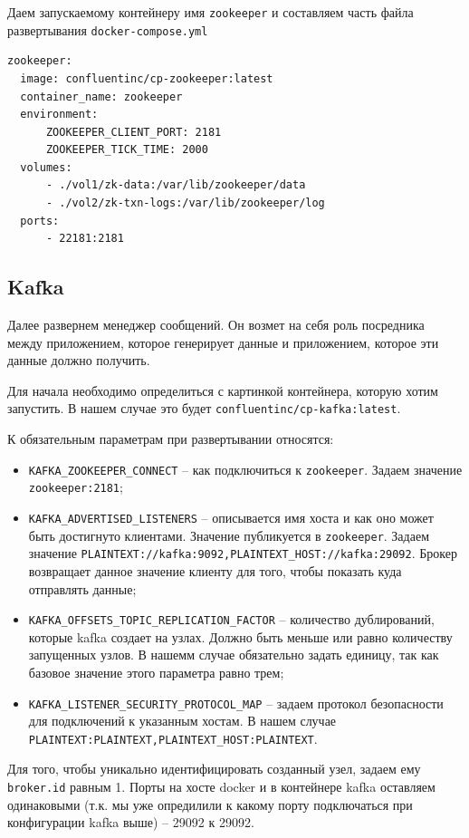 Даем запускаемому контейнеру имя \verb|zookeeper| и составляем часть файла
развертывания \verb|docker-compose.yml|
\begin{verbatim}
zookeeper:
  image: confluentinc/cp-zookeeper:latest
  container_name: zookeeper
  environment:
      ZOOKEEPER_CLIENT_PORT: 2181
      ZOOKEEPER_TICK_TIME: 2000
  volumes:
      - ./vol1/zk-data:/var/lib/zookeeper/data
      - ./vol2/zk-txn-logs:/var/lib/zookeeper/log
  ports:
      - 22181:2181
\end{verbatim}


\subsection{Kafka}
Далее развернем менеджер сообщений. Он возмет на себя роль посредника между
приложением, которое генерирует данные и приложением, которое эти данные должно
получить.

Для начала необходимо определиться с картинкой контейнера, которую хотим
запустить. В нашем случае это будет \verb|confluentinc/cp-kafka:latest|.

К обязательным параметрам при развертывании относятся:
\begin{itemize}
    \item \verb|KAFKA_ZOOKEEPER_CONNECT| -- как подключиться к \verb|zookeeper|.
        Задаем значение \verb|zookeeper:2181|;
    \item \verb|KAFKA_ADVERTISED_LISTENERS| -- описывается имя хоста и как оно
        может быть достигнуто клиентами. Значение публикуется в
        \verb|zookeeper|. Задаем значение
        \verb|PLAINTEXT://kafka:9092,PLAINTEXT_HOST://kafka:29092|. Брокер
        возвращает данное значение клиенту для того, чтобы показать куда
        отправлять данные;
    \item \verb|KAFKA_OFFSETS_TOPIC_REPLICATION_FACTOR| -- количество
        дублирований, которые kafka создает на узлах. Должно быть меньше или
        равно количеству запущенных узлов. В нашемм случае обязательно задать
        единицу, так как базовое значение этого параметра равно трем;
    \item \verb|KAFKA_LISTENER_SECURITY_PROTOCOL_MAP| -- задаем протокол
        безопасности для подключений к указанным хостам. В нашем случае
        \verb|PLAINTEXT:PLAINTEXT,PLAINTEXT_HOST:PLAINTEXT|.
\end{itemize}

Для того, чтобы уникально идентифицировать созданный узел, задаем ему
\verb|broker.id| равным 1. Порты на хосте docker и в контейнере kafka оставляем
одинаковыми (т.к. мы уже опредилили к какому порту подключаться при конфигурации
kafka выше) -- 29092 к 29092.

